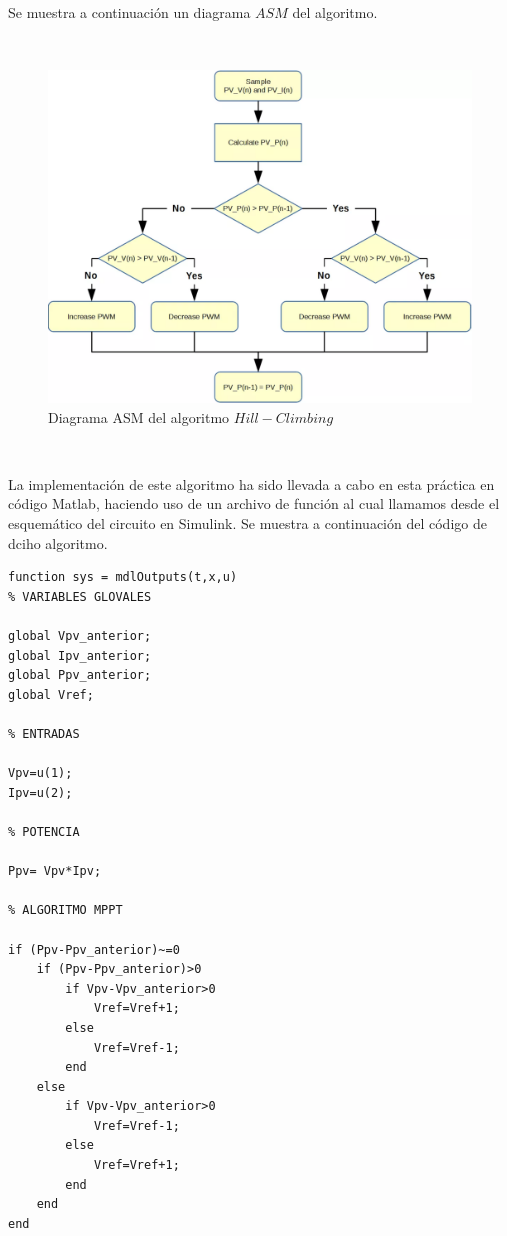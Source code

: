 \documentclass[	DIV=calc,%
							paper=letter,%
							fontsize=12pt%
                            ]{scrartcl}	 					%
\begin{document}
\newpage

Se muestra a continuación un diagrama $ASM$ del algoritmo.

\hfill
\

\begin{figure}[h]
\centering
\includegraphics[scale=0.55]{mp2}
\caption{Diagrama ASM del algoritmo $Hill-Climbing$}
\end{figure}

\hfill
\

La implementación de este algoritmo ha sido llevada a cabo en esta práctica en código Matlab, haciendo uso de un archivo de función al cual llamamos desde el esquemático del circuito en Simulink. Se muestra a continuación del código de dciho algoritmo.

\newpage

\begin{lstlisting}[frame=single]  % Inicia el bloque de código
 function sys = mdlOutputs(t,x,u)
% VARIABLES GLOVALES

global Vpv_anterior;
global Ipv_anterior;
global Ppv_anterior;
global Vref;

% ENTRADAS

Vpv=u(1);
Ipv=u(2);

% POTENCIA

Ppv= Vpv*Ipv;

% ALGORITMO MPPT
 
if (Ppv-Ppv_anterior)~=0
    if (Ppv-Ppv_anterior)>0
        if Vpv-Vpv_anterior>0
            Vref=Vref+1;
        else 
            Vref=Vref-1;
        end
    else
        if Vpv-Vpv_anterior>0
            Vref=Vref-1;
        else 
            Vref=Vref+1;
        end
    end
end


\end{lstlisting}
\end{document}
